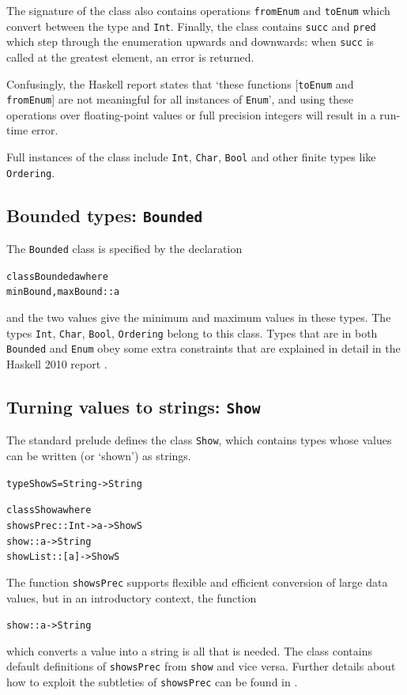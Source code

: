 The signature of the class also contains operations \texttt{fromEnum} and
\texttt{toEnum} which convert
between the type and \texttt{Int}. Finally, the class contains \texttt{succ} and \texttt{pred} which step through the enumeration upwards and downwards: when \texttt{succ} is called at the greatest element, an error is returned. 

Confusingly, the Haskell report
states that `these functions [\texttt{toEnum} and \texttt{fromEnum}] are 
not meaningful for all instances of
\texttt{Enum}', and using these operations over floating-point values or 
full precision integers will result in a run-time error.

Full instances of the class include \texttt{Int}, \texttt{Char},
\texttt{Bool} and other finite types like \texttt{Ordering}. 

\subsection*{Bounded types: \texttt{Bounded}}
The \texttt{Bounded} class is specified by the declaration
\begin{alltt}
class Bounded a where
  minBound, maxBound :: a
\end{alltt}
and the two values give the minimum and maximum values in these types.
The types \texttt{Int}, \texttt{Char}, \texttt{Bool}, \texttt{Ordering}
belong to this class. Types that are in both \texttt{Bounded} and \texttt{Enum} obey some extra constraints that are explained in detail in the Haskell 2010 report \cite{haskell2010}.

\subsection*{Turning values to strings: \texttt{Show}}

The standard prelude defines the class
\texttt{Show}, 
which contains types whose values can be written (or `shown') as strings. 
\begin{alltt}
type ShowS = String -> String

class Show a where
  showsPrec :: Int -> a -> ShowS
  show      :: a -> String
  showList  :: [a] -> ShowS
\end{alltt}
The function \texttt{showsPrec} supports flexible and efficient conversion of large data values, but in an
introductory context, the function
\begin{alltt}
show :: a -> String
\end{alltt}
which converts a value into a string is all that is needed. The class contains default definitions of
\texttt{showsPrec} from \texttt{show} and vice versa. Further details about how to exploit the subtleties of
\texttt{showsPrec} can be found in
.

